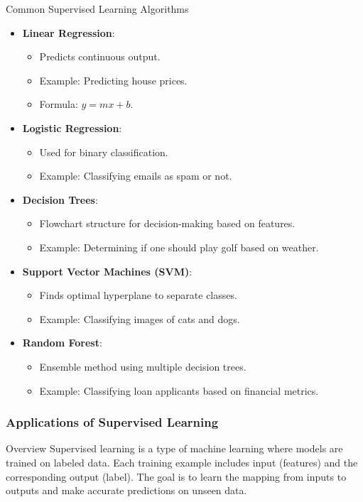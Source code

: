 \documentclass[aspectratio=169]{beamer}
\begin{document}
\begin{frame}[fragile]{Common Supervised Learning Algorithms}
  \begin{itemize}
    \item \textbf{Linear Regression}:
      \begin{itemize}
        \item Predicts continuous output.
        \item Example: Predicting house prices.
        \item Formula: $y = mx + b$.
      \end{itemize}

    \item \textbf{Logistic Regression}:
      \begin{itemize}
        \item Used for binary classification.
        \item Example: Classifying emails as spam or not.
      \end{itemize}

    \item \textbf{Decision Trees}:
      \begin{itemize}
        \item Flowchart structure for decision-making based on features.
        \item Example: Determining if one should play golf based on weather.
      \end{itemize}
    
    \item \textbf{Support Vector Machines (SVM)}:
      \begin{itemize}
        \item Finds optimal hyperplane to separate classes.
        \item Example: Classifying images of cats and dogs.
      \end{itemize}

    \item \textbf{Random Forest}:
      \begin{itemize}
        \item Ensemble method using multiple decision trees.
        \item Example: Classifying loan applicants based on financial metrics.
      \end{itemize}
  \end{itemize}
\end{frame}

\begin{frame}
    \frametitle{Applications of Supervised Learning}
    \begin{block}{Overview}
        Supervised learning is a type of machine learning where models are trained on labeled data. Each training example includes input (features) and the corresponding output (label). The goal is to learn the mapping from inputs to outputs and make accurate predictions on unseen data.
    \end{block}
\end{frame}
\end{document}
